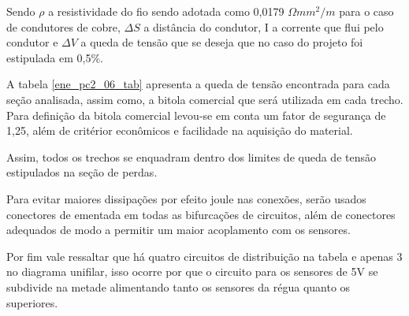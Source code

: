 Sendo $\rho$ a resistividade do fio sendo adotada como 0,0179 $\Omega mm^2 / m$ para o caso de condutores de cobre, $\Delta S$ a distância do condutor, I a corrente que flui pelo condutor e $\Delta V$ a queda de tensão que se deseja que no caso do projeto foi estipulada em 0,5\%. 

A tabela \ref{ene_pc2_06_tab} apresenta a queda de tensão encontrada para cada seção analisada, assim como, a bitola comercial que será utilizada em cada trecho. Para definição da bitola comercial levou-se em conta um fator de segurança de 1,25, além de critérior econômicos e facilidade na aquisição do material.

\begin{table}[H]
\caption{Queda de tensão por trecho de cabeamento}
\label{ene_pc2_06_tab}
\end{table}

Assim, todos os trechos se enquadram dentro dos limites de queda de tensão estipulados na seção de perdas.

Para evitar maiores dissipações por efeito joule nas conexões, serão usados conectores de ementada em todas as bifurcações de circuitos, além de conectores adequados de modo a permitir um maior acoplamento com os sensores.

Por fim vale ressaltar que há quatro circuitos de distribuição na tabela e apenas 3 no diagrama unifilar, isso ocorre por que o circuito para os sensores de 5V se subdivide na metade alimentando tanto os sensores da régua quanto os superiores.

